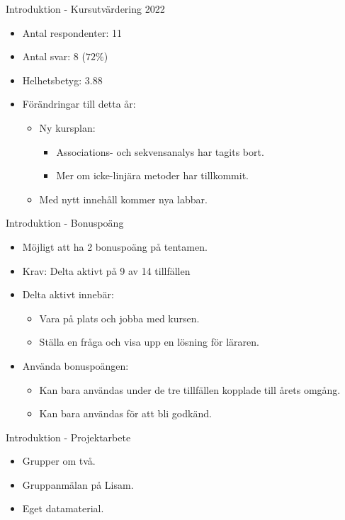 \documentclass[10pt,english]{beamer}
\begin{document}
\begin{frame}{Introduktion - Kursutvärdering 2022}
    \begin{itemize}
        \item Antal respondenter: 11
        \item Antal svar: 8 ($72\%$)
        \item Helhetsbetyg: $3.88$
        \item Förändringar till detta år:
        \begin{itemize}
            \item Ny kursplan:
            \begin{itemize}
                \item Associations- och sekvensanalys har tagits bort.
                \item Mer om icke-linjära metoder har tillkommit.
            \end{itemize}
            \item Med nytt innehåll kommer nya labbar.
        \end{itemize}
    \end{itemize}
\end{frame}
\begin{frame}{Introduktion - Bonuspoäng}
    \begin{itemize}
        \item Möjligt att ha 2 bonuspoäng på tentamen.
        \item Krav: Delta aktivt på 9 av 14 tillfällen
        \item Delta aktivt innebär:
        \begin{itemize}
            \item Vara på plats och jobba med kursen.
            \item Ställa en fråga och visa upp en lösning för läraren.
        \end{itemize}
        \item Använda bonuspoängen:
        \begin{itemize}
            \item Kan bara användas under de tre tillfällen kopplade till årets omgång.
            \item Kan bara användas för att bli godkänd.
        \end{itemize}
    \end{itemize}
\end{frame}

\begin{frame}{Introduktion - Projektarbete}
    \begin{itemize}
        \item Grupper om två.
        \item Gruppanmälan på Lisam.
        \item Eget datamaterial.
    \end{itemize}
\end{frame}
\end{document}
